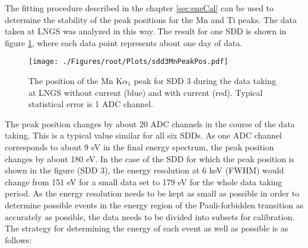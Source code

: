 The fitting procedure described in the chapter \ref{sec:eneCal} can be used to determine the stability of the peak positions for the Mn and Ti peaks. The data taken at LNGS was analyzed in this way. The result for one SDD is shown in figure \ref{fig:sdd3PeakPos}, where each data point represents about one day of data. 
\begin{figure}[h]
 \centering
 \texttt{[image: ./Figures/root/Plots/sdd3MnPeakPos.pdf]}
 \caption{The position of the Mn K$\alpha_{1}$ peak for SDD 3 during the data taking at LNGS without current (blue) and with current (red). Typical statistical error is 1 ADC channel.}
 \label{fig:sdd3PeakPos}
\end{figure}
The peak position changes by about 20 ADC channels in the course of the data taking. This is a typical value similar for all six SDDs. As one ADC channel corresponds to about 9 eV in the final energy spectrum, the peak position changes by about 180 eV. In the case of the SDD for which the peak position is shown in the figure (SDD 3), the energy resolution at 6 keV (FWHM) would change from 151 eV for a small data set to 179 eV for the whole data taking period. As the energy resolution needs to be kept as small as possible in order to determine possible events in the energy region of the Pauli-forbidden transition as accurately as possible, the data needs to be divided into subsets for calibration. The strategy for determining the energy of each event as well as possible is as follows: 


